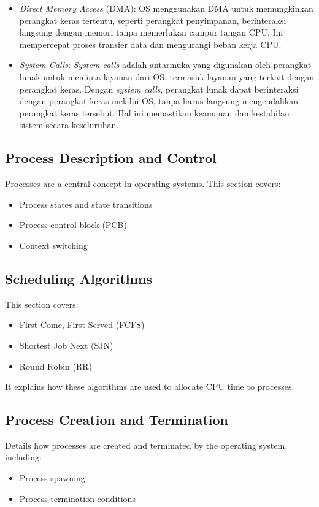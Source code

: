 \documentclass[12pt]{article}
\begin{document}
\begin{itemize}
    \item \textit{Direct Memory Access} (DMA): OS menggunakan DMA untuk memungkinkan perangkat keras tertentu, seperti perangkat penyimpanan, berinteraksi langsung dengan memori tanpa memerlukan campur tangan CPU. Ini mempercepat proses transfer data dan mengurangi beban kerja CPU.
    \item \textit{System Calls}: \textit{System calls} adalah antarmuka yang digunakan oleh perangkat lunak untuk meminta layanan dari OS, termasuk layanan yang terkait dengan perangkat keras. Dengan \textit{system calls}, perangkat lunak dapat berinteraksi dengan perangkat keras melalui OS, tanpa harus langsung mengendalikan perangkat keras tersebut. Hal ini memastikan keamanan dan kestabilan sistem secara keseluruhan.
\end{itemize}

\subsection{Process Description and Control}
Processes are a central concept in operating systems. This section covers:
\begin{itemize}
    \item Process states and state transitions
    \item Process control block (PCB)
    \item Context switching
\end{itemize}

\subsection{Scheduling Algorithms}
This section covers:
\begin{itemize}
    \item First-Come, First-Served (FCFS)
    \item Shortest Job Next (SJN)
    \item Round Robin (RR)
\end{itemize}
It explains how these algorithms are used to allocate CPU time to processes.

\subsection{Process Creation and Termination}
Details how processes are created and terminated by the operating system, including:
\begin{itemize}
    \item Process spawning
    \item Process termination conditions
\end{itemize}
\end{document}
